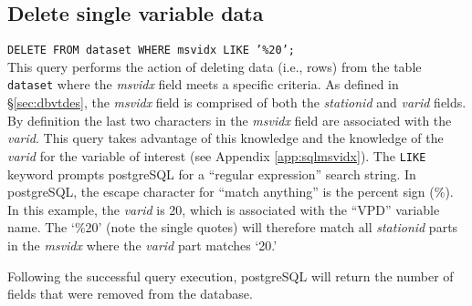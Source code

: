 \subsection{Delete single variable data}
\label{app:sqldelone}
\texttt{DELETE FROM data\textunderscore set WHERE msvidx LIKE '\%20';}\\

\noindent This query performs the action of deleting data (i.e., rows) from the table \texttt{data\textunderscore set} where the \textit{msvidx} field meets a specific criteria.  
As defined in \S \ref{sec:dbvtdes}, the \textit{msvidx} field is comprised of both the \textit{stationid} and \textit{varid} fields.  
By definition the last two characters in the \textit{msvidx} field are associated with the \textit{varid}.  
This query takes advantage of this knowledge and the knowledge of the \textit{varid} for the variable of interest (see Appendix \ref{app:sqlmsvidx}).  
The \texttt{LIKE} keyword prompts postgreSQL for a ``regular expression'' search string.  
In postgreSQL, the escape character for ``match anything'' is the percent sign (\%).  
In this example, the \textit{varid} is 20, which is associated with the ``VPD'' variable name.  
The `\%20' (note the single quotes) will therefore match all \textit{stationid} parts in the \textit{msvidx} where the \textit{varid} part matches `20.' 

Following the successful query execution, postgreSQL will return the number of fields that were removed from the database.
